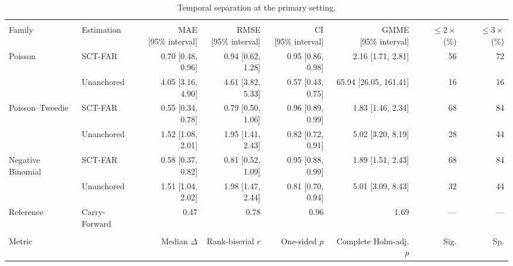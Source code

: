 \documentclass{article}
\begin{document}
\begin{table}[H]
\begin{minipage}{\linewidth}
\end{minipage}
\end{table}

\clearpage
\begin{table}[H]
\centering
\scriptsize
\captionsetup{position=top,skip=12pt}
\caption{Temporal separation at the primary setting.}
\label{tab:si-temporal-tests}
\setlength{\tabcolsep}{2pt}
\begin{tabularx}{\linewidth}{@{}>{\raggedright\arraybackslash}Xlrrrrrr@{}}
\toprule
\multicolumn{8}{c}{\textbf{Prediction Quality}} \\
\cmidrule(lr){1-8}
Family & Estimation & \shortstack{MAE\\{[95\% interval]}} & \shortstack{RMSE\\{[95\% interval]}} & \shortstack{CI\\{[95\% interval]}} & \shortstack{GMME\\{[95\% interval]}} & \shortstack{$\le 2\times$\\(\%)} & \shortstack{$\le 3\times$\\(\%)} \\
\midrule
Poisson & SCT-FAR & 0.70 [0.48, 0.96] & 0.94 [0.62, 1.28] & 0.95 [0.86, 0.98] & 2.16 [1.71, 2.81] & 56 & 72 \\
 & Unanchored & 4.05 [3.16, 4.90] & 4.61 [3.82, 5.33] & 0.57 [0.43, 0.75] & 65.94 [26.05, 161.41] & 16 & 16 \\
\addlinespace
Poisson--Tweedie & SCT-FAR & 0.55 [0.34, 0.78] & 0.79 [0.50, 1.06] & 0.96 [0.89, 0.99] & 1.83 [1.46, 2.34] & 68 & 84 \\
 & Unanchored & 1.52 [1.08, 2.01] & 1.95 [1.41, 2.43] & 0.82 [0.72, 0.91] & 5.02 [3.20, 8.19] & 28 & 44 \\
\addlinespace
Negative Binomial & SCT-FAR & 0.58 [0.37, 0.82] & 0.81 [0.52, 1.09] & 0.95 [0.88, 0.99] & 1.89 [1.51, 2.43] & 68 & 84 \\
 & Unanchored & 1.51 [1.04, 2.02] & 1.98 [1.47, 2.44] & 0.81 [0.70, 0.94] & 5.01 [3.09, 8.43] & 32 & 44 \\
\addlinespace
Reference & Carry-Forward & 0.47 & 0.78 & 0.96 & 1.69 & --- & --- \\
\midrule
\multicolumn{8}{c}{\textbf{Superiority of SCT-FAR Over Unanchored Estimation}} \\
\cmidrule(lr){1-8}
Metric & & \shortstack{Median\\$\Delta$} & \shortstack{Rank-biserial\\$r$} & \shortstack{One-sided\\$p$} & \shortstack{Complete\\Holm-adj. $p$} & Sig. & Sp. \\

\end{tabularx}
\end{table}
\end{document}
